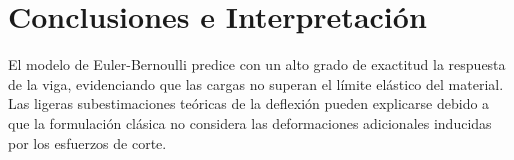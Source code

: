 \documentclass[11pt,a4paper]{article}
\begin{document}
\section{Conclusiones e Interpretación}
El modelo de Euler-Bernoulli predice con un alto grado de exactitud la respuesta de la viga, evidenciando que las cargas no superan el límite elástico del material. Las ligeras subestimaciones teóricas de la deflexión pueden explicarse debido a que la formulación clásica no considera las deformaciones adicionales inducidas por los esfuerzos de corte.
\nocite{*}


\end{document}
